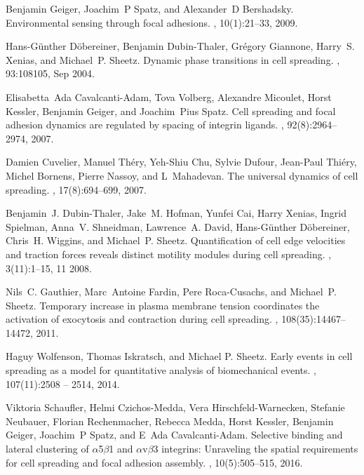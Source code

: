 \documentclass[pre,amsmath]{revtex4}
\begin{document}
\begin{thebibliography}{10}

Benjamin Geiger, Joachim~P Spatz, and Alexander~D Bershadsky.
\newblock Environmental sensing through focal adhesions.
, 10(1):21--33, 2009.

Hans-G\"unther D\"obereiner, Benjamin Dubin-Thaler, Gr\'egory Giannone,
  Harry~S. Xenias, and Michael~P. Sheetz.
\newblock Dynamic phase transitions in cell spreading.
, 93:108105, Sep 2004.

Elisabetta~Ada Cavalcanti-Adam, Tova Volberg, Alexandre Micoulet, Horst
  Kessler, Benjamin Geiger, and Joachim~Pius Spatz.
\newblock Cell spreading and focal adhesion dynamics are regulated by spacing
  of integrin ligands.
, 92(8):2964--2974, 2007.

Damien Cuvelier, Manuel Th{\'e}ry, Yeh-Shiu Chu, Sylvie Dufour, Jean-Paul
  Thi{\'e}ry, Michel Bornens, Pierre Nassoy, and L~Mahadevan.
\newblock The universal dynamics of cell spreading.
, 17(8):694--699, 2007.

Benjamin~J. Dubin-Thaler, Jake~M. Hofman, Yunfei Cai, Harry Xenias, Ingrid
  Spielman, Anna~V. Shneidman, Lawrence~A. David, Hans-Günther Döbereiner,
  Chris~H. Wiggins, and Michael~P. Sheetz.
\newblock Quantification of cell edge velocities and traction forces reveals
  distinct motility modules during cell spreading.
, 3(11):1--15, 11 2008.

Nils~C. Gauthier, Marc~Antoine Fardin, Pere Roca-Cusachs, and Michael~P.
  Sheetz.
\newblock Temporary increase in plasma membrane tension coordinates the
  activation of exocytosis and contraction during cell spreading.
,
  108(35):14467--14472, 2011.

Haguy Wolfenson, Thomas Iskratsch, and Michael P. Sheetz.
\newblock Early events in cell spreading as a model for quantitative analysis
  of biomechanical events.
, 107(11):2508 -- 2514, 2014.

Viktoria Schaufler, Helmi Czichos-Medda, Vera Hirschfeld-Warnecken, Stefanie
  Neubauer, Florian Rechenmacher, Rebecca Medda, Horst Kessler, Benjamin
  Geiger, Joachim~P Spatz, and E~Ada Cavalcanti-Adam.
\newblock Selective binding and lateral clustering of $\alpha$5$\beta$1 and
  $\alpha$v$\beta$3 integrins: Unraveling the spatial requirements for cell
  spreading and focal adhesion assembly.
, 10(5):505--515, 2016.


\end{thebibliography}
\end{document}
